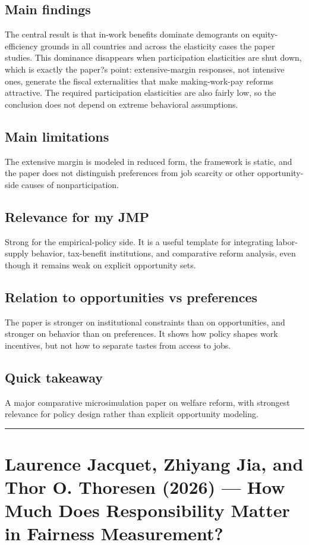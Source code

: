 \documentclass[11pt,a4paper]{article}
\begin{document}
\subsection*{Main findings}
The central result is that in-work benefits dominate demogrants on equity-efficiency grounds in all countries and across the elasticity cases the paper studies. This dominance disappears when participation elasticities are shut down, which is exactly the paper?s point: extensive-margin responses, not intensive ones, generate the fiscal externalities that make making-work-pay reforms attractive. The required participation elasticities are also fairly low, so the conclusion does not depend on extreme behavioral assumptions.

\subsection*{Main limitations}
The extensive margin is modeled in reduced form, the framework is static, and the paper does not distinguish preferences from job scarcity or other opportunity-side causes of nonparticipation.

\subsection*{Relevance for my JMP}
Strong for the empirical-policy side. It is a useful template for integrating labor-supply behavior, tax-benefit institutions, and comparative reform analysis, even though it remains weak on explicit opportunity sets.

\subsection*{Relation to opportunities vs preferences}
The paper is stronger on institutional constraints than on opportunities, and stronger on behavior than on preferences. It shows how policy shapes work incentives, but not how to separate tastes from access to jobs.

\subsection*{Quick takeaway}
A major comparative microsimulation paper on welfare reform, with strongest relevance for policy design rather than explicit opportunity modeling.


\medskip\hrule\medskip

\section*{Laurence Jacquet, Zhiyang Jia, and Thor O. Thoresen (2026) — How Much Does Responsibility Matter in Fairness Measurement?}
\end{document}
